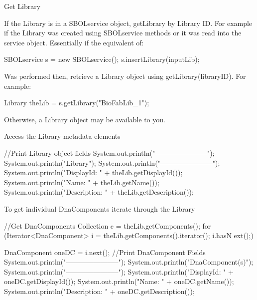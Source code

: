 \begin{DoxyEnumerate}
\item \begin{DoxyParagraph}{Get Library}

\begin{DoxyEnumerate}
\item If the Library is in a SBOLservice object, getLibrary by Library ID. For example if the Library was created using SBOLservice methods or it was read into the service object. Essentially if the equivalent of: 
\begin{DoxyCode}
       SBOLservice s = new SBOLservice();
       s.insertLibrary(inputLib);
\end{DoxyCode}
 Was performed then, retrieve a Library object using getLibrary(libraryID). For example: 
\begin{DoxyCode}
        Library theLib = s.getLibrary("BioFabLib_1");
\end{DoxyCode}

\item Otherwise, a Library object may be available to you.
\end{DoxyEnumerate}
\end{DoxyParagraph}

\item \begin{DoxyParagraph}{Access the Library metadata elements}

\begin{DoxyCode}
        //Print Library object fields
        System.out.println("-----------------------");
        System.out.println("Library");
        System.out.println("-----------------------");
        System.out.println("DisplayId: " + theLib.getDisplayId());
        System.out.println("Name: " + theLib.getName());
        System.out.println("Description: " + theLib.getDescription());
\end{DoxyCode}

\end{DoxyParagraph}

\item \begin{DoxyParagraph}{To get individual DnaComponents iterate through the Library}

\begin{DoxyCode}
        //Get DnaComponents
        Collection c = theLib.getComponents();
        for (Iterator<DnaComponent> i = theLib.getComponents().iterator(); i.hasN
      ext();) {
            DnaComponent oneDC = i.next();
            //Print DnaComponent Fields
            System.out.println("-----------------------");
            System.out.println("DnaComponent(s)");
            System.out.println("-----------------------");
            System.out.println("DisplayId: " + oneDC.getDisplayId());
            System.out.println("Name: " + oneDC.getName());
            System.out.println("Description: " + oneDC.getDescription());

}
\end{DoxyCode}
\end{DoxyParagraph}
\end{DoxyEnumerate}
